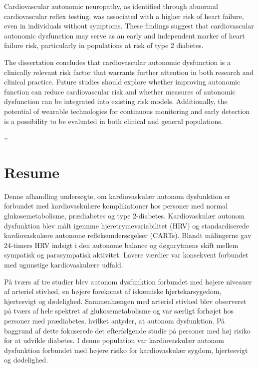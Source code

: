 \documentclass[
  a4paper,
  headsepline=true,
  open=any]{scrbook}
\begin{document}
Cardiovascular autonomic neuropathy, as identified through abnormal
cardiovascular reflex testing, was associated with a higher risk of
heart failure, even in individuals without symptoms. These findings
suggest that cardiovascular autonomic dysfunction may serve as an early
and independent marker of heart failure risk, particularly in
populations at risk of type 2 diabetes.

The dissertation concludes that cardiovascular autonomic dysfunction is
a clinically relevant risk factor that warrants further attention in
both research and clinical practice. Future studies should explore
whether improving autonomic function can reduce cardiovascular risk and
whether measures of autonomic dysfunction can be integrated into
existing risk models. Additionally, the potential of wearable
technologies for continuous monitoring and early detection is a
possibility to be evaluated in both clinical and general populations.

\newpage

\thispagestyle{empty}

\textasciitilde{} \newpage


\hypertarget{resume}{%
\chapter*{Resume}\label{resume}}


Denne afhandling undersøgte, om kardiovaskulær autonom dysfunktion er
forbundet med kardiovaskulære komplikationer hos personer med normal
glukosemetabolisme, prædiabetes og type 2-diabetes. Kardiovaskulær
autonom dysfunktion blev målt igennme hjeretrymevariabilitet (HRV) og
standardiserede kardiovaskulære autonome refleksundersøgelser (CARTs).
Blandt målingerne gav 24-timers HRV indsigt i den autonome balance og
døgnrytmens skift mellem sympatisk og parasympatisk aktivitet. Lavere
værdier var konsekvent forbundet med ugunstige kardiovaskulære udfald.

På tværs af tre studier blev autonom dysfunktion forbundet med højere
niveauer af arteriel stivhed, en højere forekomst af iskæmiske
hjertekarsygedom, hjertesvigt og dødelighed. Sammenhængen med arteriel
stivhed blev observeret på tværs af hele spektret af glukosemetabolisme
og var særligt forhøjet hos personer med prædiabetes, hvilket antyder,
at autonom dysfunktion. På baggrund af dette fokuserede det
efterfølgende studie på personer med høj risiko for at udvikle diabetes.
I denne population var kardiovaskulær autonom dysfunktion forbundet med
højere risiko for kardiovaskulær sygdom, hjertesvigt og dødelighed.
\end{document}
